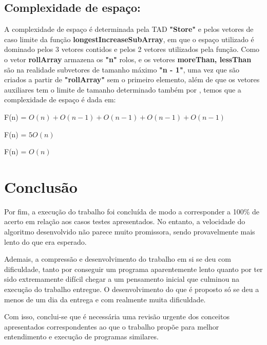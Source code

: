 \documentclass[12pt]{article}
\begin{document}
    \subsection{Complexidade de espaço:}
    \par A complexidade de espaço é determinada pela TAD \textbf{"Store"} e pelos vetores de caso limite da função \textbf{longestIncreaseSubArray}, em que o espaço utilizado é dominado pelos 3 vetores contidos e pelos 2 vetores utilizados pela função. Como o vetor \textbf{rollArray} armazena os \textbf{"n"} rolos, e os vetores \textbf{moreThan, lessThan} são na realidade subvetores de tamanho máximo \textbf{"n - 1"}, uma vez que são criados a partir de \textbf{"rollArray"} sem o primeiro elemento, além de que os vetores auxiliares tem o limite de tamanho determinado também por , temos que a complexidade de espaço é dada em:
    \begin{center}
        F(n) = $O(n) + O(n-1) + O(n-1) + O(n-1) + O(n-1)$
        \par F(n) = $5O(n)$
        \par F(n) = $O(n)$
    \end{center}



\section{Conclusão}
    \par Por fim, a execução do trabalho foi concluída de modo a corresponder a 100\% de acerto em relação aos casos testes apresentados. No entanto, a velocidade do algoritmo desenvolvido não parece muito promissora, sendo provavelmente mais lento do que era esperado.
    \par Ademais, a compressão e desenvolvimento do trabalho em si se deu com dificuldade, tanto por conseguir um programa aparentemente lento quanto por ter sido extremamente difícil chegar a um pensamento inicial que culminou na execução do trabalho entregue. O desenvolvimento do que é proposto só se deu a menos de um dia da entrega e com realmente muita dificuldade.
    \par Com isso, conclui-se que é necessária uma revisão urgente dos conceitos apresentados correspondentes ao que o trabalho propõe para melhor entendimento e execução de programas similares.


\end{document}
